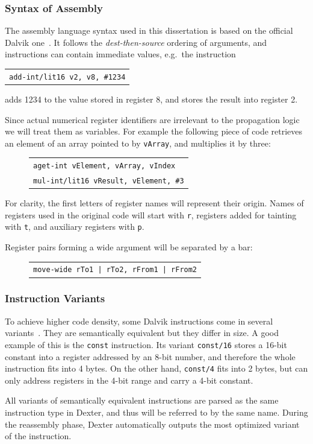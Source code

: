 \documentclass[12pt,twoside,notitlepage]{report}
\newcommand{\centerbox}[1] {
	\begin{center}
	\begin{footnotesize}
	\begin{tabular}{l}
		#1
	\end{tabular}
	\end{footnotesize}
	\end{center}
}
\newcommand{\asm}[1] {\texttt{#1}}
\begin{document}
\subsubsection{Syntax of Assembly}

The assembly language syntax used in this dissertation is based on the official Dalvik one~\cite{web:DalvikBytecode}. It follows the \emph{dest-then-source} ordering of arguments, and instructions can contain immediate values, e.g.\ the instruction
		\centerbox{
			\asm{add-int/lit16 v2, v8, \#1234}
		}
adds 1234 to the value stored in register 8, and stores the result into register 2. 

Since actual numerical register identifiers are irrelevant to the propagation logic we will treat them as variables. For example the following piece of code retrieves an element of an array pointed to by \verb$vArray$, and multiplies it by three:
	\begin{figure}[H]
		\centerbox{
			\asm{aget-int vElement, vArray, vIndex} \\
			\asm{mul-int/lit16 vResult, vElement, \#3}
		}
	\end{figure}

For clarity, the first letters of register names will represent their origin. Names of registers used in the original code will start with \verb$r$, registers added for tainting with \verb$t$, and auxiliary registers with \verb$p$.

Register pairs forming a wide argument will be separated by a bar:
	\begin{figure}[H]
		\centerbox{
			\asm{move-wide rTo1 | rTo2, rFrom1 | rFrom2}
		}
	\end{figure}

\subsubsection{Instruction Variants}

To achieve higher code density, some Dalvik instructions come in several variants~\cite{web:DalvikBytecode}. They are semantically equivalent but they differ in size. A good example of this is the \verb$const$ instruction. Its variant \verb$const/16$ stores a 16-bit constant into a register addressed by an 8-bit number, and therefore the whole instruction fits into 4 bytes. On the other hand, \verb$const/4$ fits into 2 bytes, but can only address registers in the 4-bit range and carry a 4-bit constant.

All variants of semantically equivalent instructions are parsed as the same instruction type in Dexter, and thus will be referred to by the same name. During the reassembly phase, Dexter automatically outputs the most optimized variant of the instruction.
\end{document}
